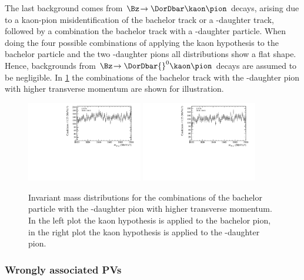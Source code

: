 The last background comes from $\Bz\!\to\DorDbar\kaon\pion$ decays, arising due to a kaon-pion misidentification of the bachelor track or a \Dm-daughter track, followed by a combination the bachelor track with a \Dm-daughter particle.
When doing the four possible combinations of applying the kaon hypothesis to the bachelor particle and the two \Dm-daughter pions all distributions show a flat shape.
Hence, backgrounds from $\Bz\!\to\DorDbar{}^0\kaon\pion$ decays are assumed to be negligible.
In \cref{fig:DzVeto} the combinations of the bachelor track with the \Dm-daughter pion with higher transverse momentum are shown for illustration.
\begin{figure}[tbp]
    \centering
    \includegraphics[width=0.45\textwidth]{06selection/figs/D0Hypo3.pdf}
    \includegraphics[width=0.45\textwidth]{06selection/figs/D0Hypo4.pdf}
    \caption{Invariant mass distributions for the combinations of the bachelor particle with the \Dm-daughter pion with higher transverse momentum.
    In the left plot the kaon hypothesis is applied to the bachelor pion, in the right plot the kaon hypothesis is applied to the \Dm-daughter pion.}
    \label{fig:DzVeto}
\end{figure}

\subsubsection*{Wrongly associated PVs}

